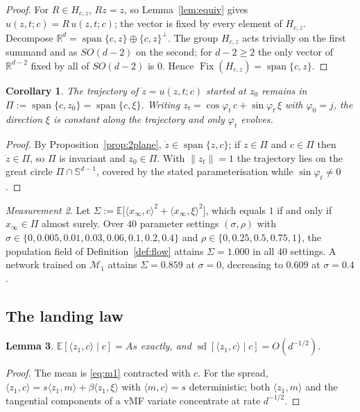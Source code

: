 \documentclass[11pt]{article}
\newtheorem{lemma}{Lemma}[section]
\newtheorem{corollary}[lemma]{Corollary}
\theoremstyle{definition}
\theoremstyle{remark}
\newtheorem{measurement}[lemma]{Measurement}
\DeclareMathOperator{\spn}{span}
\DeclareMathOperator{\sd}{sd}
\DeclareMathOperator{\Fix}{Fix}
\newcommand{\Sph}{\mathbb{S}^{d-1}}
\newcommand{\R}{\mathbb{R}}
\newcommand{\E}{\mathbb{E}}
\begin{document}
\begin{proof}
For $R\in H_{c,z}$, $Rz=z$, so Lemma~\ref{lem:equiv} gives $u(z,t;c)=R\,u(z,t;c)$; the vector is
fixed by every element of $H_{c,z}$. Decompose $\R^{d}=\spn\{c,z\}\oplus\{c,z\}^{\perp}$. The
group $H_{c,z}$ acts trivially on the first summand and as $SO(d-2)$ on the second; for
$d-2\geq2$ the only vector of $\R^{d-2}$ fixed by all of $SO(d-2)$ is $0$. Hence
$\Fix(H_{c,z})=\spn\{c,z\}$.
\end{proof}

\begin{corollary}\label{cor:azimuth}
The trajectory of $\dot z=u(z,t;c)$ started at $z_0$ remains in $\Pi:=\spn\{c,z_0\}=\spn\{c,\xi\}$.
Writing $z_t=\cos\varphi_t\,c+\sin\varphi_t\,\xi$ with $\varphi_0=j$, the direction $\xi$ is
constant along the trajectory and only $\varphi_t$ evolves.
\end{corollary}

\begin{proof}
By Proposition~\ref{prop:2plane}, $\dot z\in\spn\{z,c\}$; if $z\in\Pi$ and $c\in\Pi$ then
$\dot z\in\Pi$, so $\Pi$ is invariant and $z_0\in\Pi$. With $\|z_t\|=1$ the trajectory lies on the
great circle $\Pi\cap\Sph$, covered by the stated parameterisation while $\sin\varphi_t\neq0$.
\end{proof}

\begin{measurement}\label{meas:azimuth}
Let $\Sigma:=\E\big[\langle x_\infty,c\rangle^{2}+\langle x_\infty,\xi\rangle^{2}\big]$, which
equals $1$ if and only if $x_\infty\in\Pi$ almost surely. Over $40$ parameter settings
$(\sigma,\rho)$ with $\sigma\in\{0,0.005,0.01,0.03,0.06,0.1,0.2,0.4\}$ and
$\rho\in\{0,0.25,0.5,0.75,1\}$, the population field of Definition~\ref{def:flow} attains
$\Sigma=1.000$ in all $40$ settings. A network trained on $\mathcal M_1$ attains
$\Sigma=0.859$ at $\sigma=0$, decreasing to $0.609$ at $\sigma=0.4$.
\end{measurement}

\subsection{The landing law}

\begin{lemma}\label{lem:polar}
$\E[\langle z_1,c\rangle\mid c]=As$ exactly, and $\sd[\langle z_1,c\rangle\mid c]=O(d^{-1/2})$.
\end{lemma}

\begin{proof}
The mean is \eqref{eq:m1} contracted with $c$. For the spread,
$\langle z_1,c\rangle=s\langle z_1,m\rangle+\beta\langle z_1,\xi\rangle$ with $\langle m,c\rangle=s$
deterministic; both $\langle z_1,m\rangle$ and the tangential components of a vMF variate
concentrate at rate $d^{-1/2}$.
\end{proof}
\end{document}
